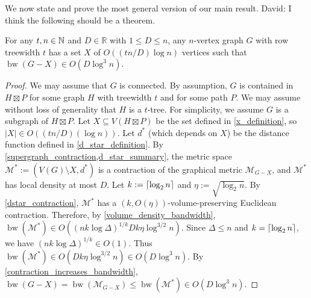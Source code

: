 \documentclass{patmorin}
\renewcommand{\le}{\leqslant}
\renewcommand{\leq}{\leqslant}
\newcommand{\david}[1]{{\color{orange} David: #1}}
\DeclareMathOperator{\bw}{bw}
\begin{document}


We now state and prove the most general version of our main result. 
\david{I think the following should be a theorem.}

\begin{lem}
\label{main_thm_products_D}
For any $t,n\in\mathbb{N}$ and $D\in\mathbb{R}$ with $1\leq D\leq n$, any $n$-vertex graph $G$ with row treewidth $t$ has a set $X$ of $O((tn/D)\log n)$ vertices such that $\bw(G-X)\in O(D\log^3 n)$.
\end{lem}

\begin{proof}
We may assume that $G$ is connected.
By assumption, $G$ is contained in $H\boxtimes P$ for some graph $H$ with treewidth $t$ and for some path $P$.
We may assume without loss of generality that $H$ is a $t$-tree. For simplicity, we assume $G$ is a subgraph of $H\boxtimes P$. Let $X\subseteq V(H\boxtimes P)$ be the set defined in \cref{x_definition}, so $|X|\in O((tn/D)(\log n))$. Let $d^*$ (which depends on $X$) be the distance function defined in \cref{d_star_definition}.  By \cref{supergraph_contraction,d_star_summary}, the metric space $\mathcal{M}^*:=(V(G)\setminus X,d^*)$ is a contraction of the graphical metric $\mathcal{M}_{G-X}$, and 
$\mathcal{M}^*$ has local density at most $D$. Let $k:={\lceil \log_2n \rceil}$ and $\eta:=\sqrt{\log_2 n}$.
By \cref{dstar_contraction}, $\mathcal{M}^*$ has a $(k,O(\eta))$-volume-preserving Euclidean contraction.  Therefore, by \cref{volume_density_bandwidth}, $\bw(\mathcal{M}^*)\in
O( (nk\log\Delta)^{1/k} Dk\eta \log^{3/2} n)$.
Since $\Delta\leq n$ and $k={\lceil \log_2n \rceil}$, we have
$(nk\log\Delta)^{1/k}\in O(1)$.
Thus
$\bw(\mathcal{M}^*)\in O(  Dk\eta \log^{3/2} n) \in O(D\log^3 n)$.
By \cref{contraction_increases_bandwidth}, $\bw(G-X) =\bw(\mathcal{M}_{G-X})\le \bw(\mathcal{M}^*) \in
O(D\log^3 n)$.
\end{proof}
\end{document}
